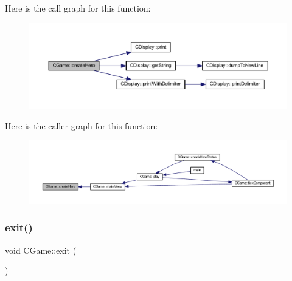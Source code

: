 Here is the call graph for this function\+:\nopagebreak
\begin{figure}[H]
\begin{center}
\leavevmode
\includegraphics[width=350pt]{class_c_game_a21a30939333b2c98f607d9bd2927d105_cgraph}
\end{center}
\end{figure}
Here is the caller graph for this function\+:\nopagebreak
\begin{figure}[H]
\begin{center}
\leavevmode
\includegraphics[width=350pt]{class_c_game_a21a30939333b2c98f607d9bd2927d105_icgraph}
\end{center}
\end{figure}
\mbox{\label{class_c_game_a7b4409fd50b77ae5743a30bd43f01f61}} 
\subsubsection{\texorpdfstring{exit()}{exit()}}
{\footnotesize\ttfamily void C\+Game\+::exit (\begin{DoxyParamCaption}{ }\end{DoxyParamCaption})\hspace{0.3cm}{\ttfamily [protected]}}

